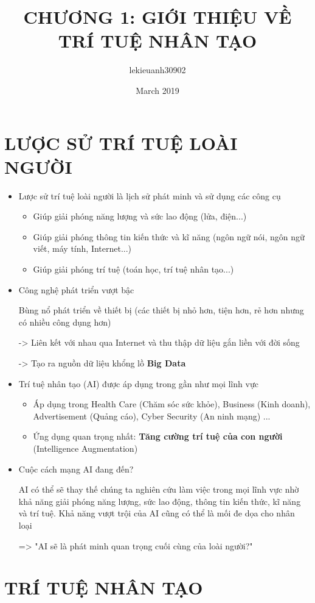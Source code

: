 \documentclass{article}
\title{CHƯƠNG 1: GIỚI THIỆU VỀ TRÍ TUỆ NHÂN TẠO}
\author{lekieuanh30902 }
\date{March 2019}
\begin{document}
\maketitle 

\section{LƯỢC SỬ TRÍ TUỆ LOÀI NGƯỜI}
\begin{itemize}
    \item Lược sử trí tuệ loài người là lịch sử phát minh và sử dụng các công cụ
    \begin{itemize}
        \item Giúp giải phóng năng lượng và sức lao động (lửa, điện...)
        \item Giúp giải phóng thông tin kiến thức và kĩ năng (ngôn ngữ nói, ngôn ngữ viết, máy tính, Internet...)
        \item Giúp giải phóng trí tuệ (toán học, trí tuệ nhân tạo...)
    \end{itemize}
    \item Công nghệ phát triển vượt bậc
    
    Bùng nổ phát triển về thiết bị (các thiết bị nhỏ hơn, tiện hơn, rẻ hơn nhưng có nhiều công dụng hơn)

-> Liên kết với nhau qua Internet và thu thập dữ liệu gắn liền với đời sống

-> Tạo ra nguồn dữ liệu khổng lồ \textbf{Big Data} 
    \item  Trí tuệ nhân tạo (AI) được áp dụng trong gần như mọi lĩnh vực
    \begin{itemize}
        \item Áp dụng trong Health Care (Chăm sóc sức khỏe), Business (Kinh doanh), Advertisement (Quảng cáo), Cyber Security (An ninh mạng) ...
        \item Ứng dụng quan trọng nhất: \textbf{Tăng cường trí tuệ của con người} (Intelligence Augmentation)
    \end{itemize}
    \item Cuộc cách mạng AI đang đến?
    
    AI có thể sẽ thay thế chúng ta nghiên cứu làm việc trong mọi lĩnh vực nhờ khả năng giải phóng năng lượng, sức lao động, thông tin kiến thức, kĩ năng và trí tuệ. Khả năng vượt trội của AI cũng có thể là mối đe dọa cho nhân loại

=> "AI sẽ là phát minh quan trọng cuối cùng của loài người?"
\end{itemize}
\section{TRÍ TUỆ NHÂN TẠO}
\end{document}
